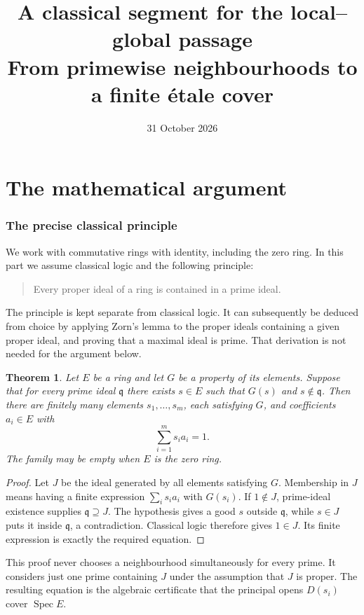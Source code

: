 \documentclass[11pt]{article}
\title{A classical segment for the local--global passage\\
\large From primewise neighbourhoods to a finite \'etale cover}
\author{}
\date{31 October 2026}
\newtheorem{theorem}{Theorem}
\begin{document}
\maketitle

\part{The mathematical argument}

\section{The precise classical principle}

We work with commutative rings with identity, including the zero ring.
In this part we assume classical logic and the following principle:
\begin{quote}
Every proper ideal of a ring is contained in a prime ideal.
\end{quote}
The principle is kept separate from classical logic. It can subsequently
be deduced from choice by applying Zorn's lemma to the proper ideals
containing a given proper ideal, and proving that a maximal ideal is
prime. That derivation is not needed for the argument below.

\begin{theorem}\label{thm:cover}
Let $E$ be a ring and let $G$ be a property of its elements. Suppose
that for every prime ideal $\mathfrak q$ there exists $s\in E$ such that
$G(s)$ and $s\notin\mathfrak q$. Then there are finitely many elements
$s_1,\ldots,s_m$, each satisfying $G$, and coefficients $a_i\in E$ with
\[
 \sum_{i=1}^m s_i a_i=1.
\]
The family may be empty when $E$ is the zero ring.
\end{theorem}
\begin{proof}
Let $J$ be the ideal generated by all elements satisfying $G$. Membership
in $J$ means having a finite expression $\sum_i s_i a_i$ with $G(s_i)$.
If $1\notin J$, prime-ideal existence supplies $\mathfrak q\supseteq J$.
The hypothesis gives a good $s$ outside $\mathfrak q$, while $s\in J$
puts it inside $\mathfrak q$, a contradiction. Classical logic therefore
gives $1\in J$. Its finite expression is exactly the required equation.
\end{proof}

This proof never chooses a neighbourhood simultaneously for every prime.
It considers just one prime containing $J$ under the assumption that $J$
is proper. The resulting equation is the algebraic certificate that
the principal opens $D(s_i)$ cover $\operatorname{Spec}E$.
\end{document}
